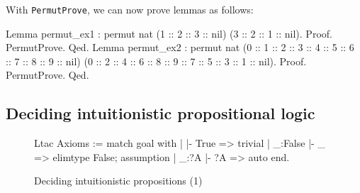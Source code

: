 \begin{coq_example}
With {\tt PermutProve}, we can now prove lemmas as 
follows:

\begin{coq_example*}
Lemma permut_ex1 :
  permut nat (1 :: 2 :: 3 :: nil) (3 :: 2 :: 1 :: nil).
Proof. PermutProve. Qed.
Lemma permut_ex2 :
  permut nat
    (0 :: 1 :: 2 :: 3 :: 4 :: 5 :: 6 :: 7 :: 8 :: 9 :: nil)
    (0 :: 2 :: 4 :: 6 :: 8 :: 9 :: 7 :: 5 :: 3 :: 1 :: nil).
Proof. PermutProve. Qed.
\end{coq_example*}


\subsection{Deciding intuitionistic propositional logic}

\begin{figure}[b]
\begin{centerframe}
\begin{coq_example}
Ltac Axioms :=
  match goal with
  | |- True => trivial
  | _:False |- _  => elimtype False; assumption
  | _:?A |- ?A  => auto
  end.
\end{coq_example}
\end{centerframe}
\caption{Deciding intuitionistic propositions (1)}
\label{tautoltaca}
\end{figure}



\end{coq_example}
